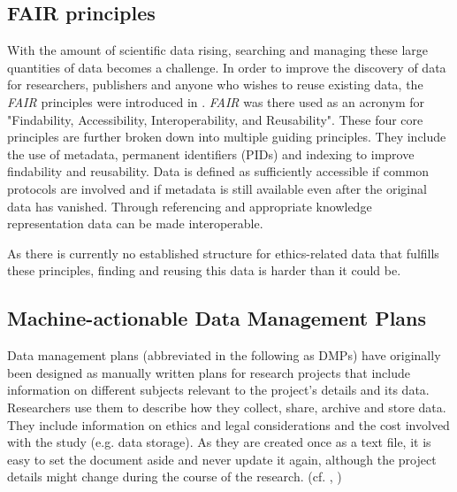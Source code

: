 \documentclass[10pt]{article}
\begin{document}
\subsection{FAIR principles}
With the amount of scientific data rising, searching and managing these large quantities of data becomes a challenge. In order to improve the discovery of data for researchers, publishers and anyone who wishes to reuse existing data, the \textit{FAIR} principles were introduced in \cite{fair}. \textit{FAIR} was there used as an acronym for "Findability, Accessibility, Interoperability, and Reusability". These four core principles are further broken down into multiple guiding principles. They include the use of metadata, permanent identifiers (PIDs) and indexing to improve findability and reusability. Data is defined as sufficiently accessible if common protocols are involved and if metadata is still available even after the original data has vanished. Through referencing and appropriate knowledge representation data can be made interoperable. 

As there is currently no established structure for ethics-related data that fulfills these principles, finding and reusing this data is harder than it could be.  

\subsection{Machine-actionable Data Management Plans}
Data management plans (abbreviated in the following as DMPs) have originally been designed as manually written plans for research projects that include information on different subjects relevant to the project's details and its data. Researchers use them to describe how they collect, share, archive and store data. They include information on ethics and legal considerations and the cost involved with the study (e.g. data storage). As they are created once as a text file, it is easy to set the document aside and never update it again, although the project details might change during the course of the research. (cf. \cite{madmp}, \cite{dmp})
\end{document}
